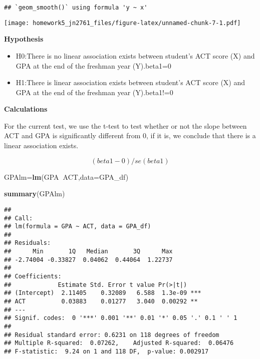 \documentclass[]{article}
\newenvironment{Shaded}{\begin{snugshade}}{\end{snugshade}}
\newcommand{\DataTypeTok}[1]{\textcolor[rgb]{0.13,0.29,0.53}{#1}}
\newcommand{\KeywordTok}[1]{\textcolor[rgb]{0.13,0.29,0.53}{\textbf{#1}}}
\newcommand{\NormalTok}[1]{#1}
\newcommand{\OperatorTok}[1]{\textcolor[rgb]{0.81,0.36,0.00}{\textbf{#1}}}
\begin{document}
\begin{verbatim}
## `geom_smooth()` using formula 'y ~ x'
\end{verbatim}

\texttt{[image: homework5\_jn2761\_files/figure-latex/unnamed-chunk-7-1.pdf]}

\textbf{Hypothesis}

\begin{itemize}
\item
  H0:There is no linear association exists between student's ACT score
  (X) and GPA at the end of the freshman year (Y).beta1=0
\item
  H1:There is linear association exists between student's ACT score (X)
  and GPA at the end of the freshman year (Y).beta1!=0
\end{itemize}

\textbf{Calculations}

For the current test, we use the t-test to test whether or not the slope
between ACT and GPA is significantly different from 0, if it is, we
conclude that there is a linear association exists.

\[ (beta1-0)/se(beta1) \]

\begin{Shaded}
\begin{Highlighting}[]
\NormalTok{GPAlm=}\KeywordTok{lm}\NormalTok{(GPA}\OperatorTok{~}\NormalTok{ACT,}\DataTypeTok{data=}\NormalTok{GPA_df)}
\end{Highlighting}
\end{Shaded}

\begin{Shaded}
\begin{Highlighting}[]
\KeywordTok{summary}\NormalTok{(GPAlm)}
\end{Highlighting}
\end{Shaded}

\begin{verbatim}
## 
## Call:
## lm(formula = GPA ~ ACT, data = GPA_df)
## 
## Residuals:
##      Min       1Q   Median       3Q      Max 
## -2.74004 -0.33827  0.04062  0.44064  1.22737 
## 
## Coefficients:
##             Estimate Std. Error t value Pr(>|t|)    
## (Intercept)  2.11405    0.32089   6.588  1.3e-09 ***
## ACT          0.03883    0.01277   3.040  0.00292 ** 
## ---
## Signif. codes:  0 '***' 0.001 '**' 0.01 '*' 0.05 '.' 0.1 ' ' 1
## 
## Residual standard error: 0.6231 on 118 degrees of freedom
## Multiple R-squared:  0.07262,    Adjusted R-squared:  0.06476 
## F-statistic:  9.24 on 1 and 118 DF,  p-value: 0.002917
\end{verbatim}
\end{document}
